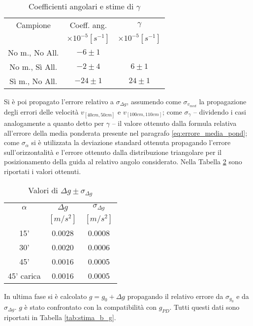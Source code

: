 \documentclass[a4paper,11pt,oneside]{article}
\begin{document}
\begin{table}[h!]
\centering
\begin{tabular}{c|c|c}
    \toprule
        Campione & Coeff. ang. & $\gamma$\\
        & $\times 10^{-5} [\si{s^{-1}}]$& $\times 10^{-5} [\si{s^{-1}}]$\\
    \midrule
        No m., No All. &  $-6 \pm 1$ & \\ 
        No m., Sì All. & $-2 \pm 4$ & \multirow{-2}{*}{   $6 \pm 1$} \\
        \hline
        Sì m., No All. &  $-24 \pm 1$ & $24 \pm 1$\\
     \bottomrule
\end{tabular}
    \caption{Coefficienti angolari e stime di $\gamma$}
    \label{tab:stime_di_gamma}
\end{table}

Si è poi propagato l'errore relativo a $\sigma_{\Delta g}$, assumendo come $\sigma_{v_{med}}$ la propagazione degli errori delle velocità $v_{[40cm,50cm]}$ e $v_{[100cm,110cm]}$; come $\sigma_{\gamma}$ -- dividendo i casi analogamente a quanto detto per $\gamma$ -- il valore ottenuto dalla formula relativa all'errore della media ponderata presente nel paragrafo \ref{eq:errore_media_pond}; come $\sigma_{\alpha}$ si è utilizzata la deviazione standard ottenuta propagando l'errore sull'orizzontalità e l'errore ottenuto dalla distribuzione triangolare per il posizionamento della guida al relativo angolo considerato. Nella Tabella \ref{tab:deltag} sono riportati i valori ottenuti.


\begin{table}[h!]%
    \centering
    \begin{tabular}{c|c|c}
        \toprule
        $\alpha$ & $\Delta g$ & $\sigma_{\Delta g}$ \\
        &$[\si{m/s^2}]$&$[\si{m/s^2}]$\\
        
    \midrule
    15' & 0.0028 & 0.0008 \\ 
    30' & 0.0020 & 0.0006 \\
    45' & 0.0016 & 0.0005 \\
    45' carica & 0.0016 & 0.0005 \\
 \bottomrule
    \end{tabular}
    \caption{Valori di $\Delta g \pm \sigma_{\Delta g}$}
    \label{tab:deltag}
\end{table}

In ultima fase si è calcolato $g=g_0 + \Delta g$ propagando il relativo errore da $\sigma_{g_{0}}$ e da $\sigma_{\Delta g}$. $g$ è stato confrontato con la compatibilità con $g_{PD}$. Tutti questi dati sono riportati in Tabella \ref{tab:stima_b_g}.\\
\end{document}
